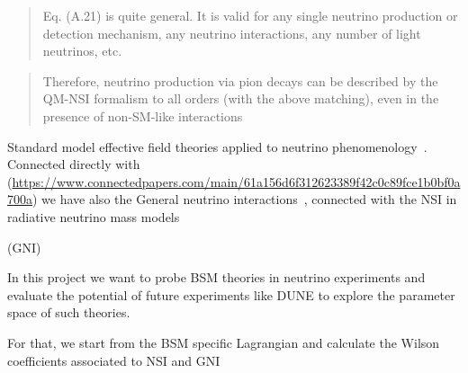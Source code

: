 \documentclass[a4paper,10pt,epsfig,epsf,amsfonts,amsmath]{article}
\begin{document}
\begin{ideas}
\begin{quote}
    Eq. (A.21) is quite general. It is valid for any single neutrino production or detection
mechanism, any neutrino interactions, any number of light neutrinos, etc.
\end{quote}

\begin{quote}
    Therefore, neutrino production via pion decays can be described
by the QM-NSI formalism to all orders (with the above matching), even in the presence of
non-SM-like interactions
\end{quote}

\end{ideas}


Standard model effective field theories applied to neutrino phenomenology~\cite{1901.04553,1910.02971,2011.14292}.
Connected directly with~\cite{1901.04553} (\url{https://www.connectedpapers.com/main/61a156d6f312623389f42c0c89fce1b0bf0a700a}) we have also the General neutrino interactions~\cite{1905.08699}, 
connected with the NSI in radiative neutrino mass models~\cite{1907.09498}



(GNI)

In this project we want to probe BSM theories in neutrino experiments and evaluate the potential of future experiments like DUNE to explore the parameter space of such theories.

For that, we start from the BSM specific Lagrangian and calculate the Wilson coefficients associated to NSI and GNI
\end{document}
